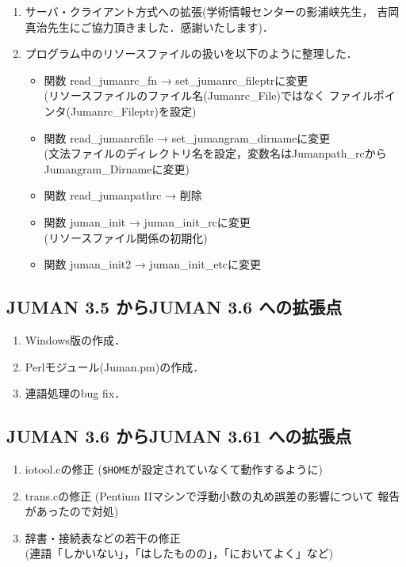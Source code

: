 \documentclass[a4j,titlepage]{jarticle}
\begin{document}
\begin{enumerate}
\item サーバ・クライアント方式への拡張(学術情報センターの影浦峡先生，
  吉岡真治先生にご協力頂きました．感謝いたします)．

\item プログラム中のリソースファイルの扱いを以下のように整理した．
  \begin{itemize}
  \item 関数 read\_jumanrc\_fn → set\_jumanrc\_fileptrに変更 \\
    (リソースファイルのファイル名(Jumanrc\_File)ではなく
    ファイルポインタ(Jumanrc\_Fileptr)を設定)
  \item 関数 read\_jumanrcfile → set\_jumangram\_dirnameに変更 \\
    (文法ファイルのディレクトリ名を設定，変数名はJumanpath\_rcから
    Jumangram\_Dirnameに変更)
  \item 関数 read\_jumanpathrc → 削除
  \item 関数 juman\_init → juman\_init\_rcに変更 \\
    (リソースファイル関係の初期化)
  \item 関数 juman\_init2  → juman\_init\_etcに変更 \\
  \end{itemize}
\end{enumerate}

\subsection{JUMAN 3.5 からJUMAN 3.6 への拡張点}

\begin{enumerate}
\item Windows版の作成．
\item Perlモジュール(Juman.pm)の作成．
\item 連語処理のbug fix．
\end{enumerate}

\subsection{JUMAN 3.6 からJUMAN 3.61 への拡張点}

\begin{enumerate}
\item iotool.cの修正 ({\tt \$HOME}が設定されていなくて動作するように)
\item trans.cの修正 (Pentium IIマシンで浮動小数の丸め誤差の影響について
  報告があったので対処)
\item 辞書・接続表などの若干の修正 \\
  (連語「しかいない」，「はしたものの」，「においてよく」など)
\end{enumerate}
\end{document}
